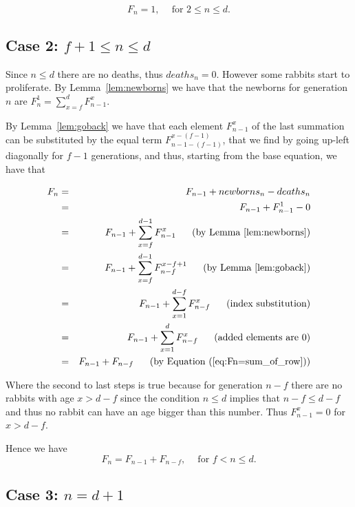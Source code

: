 \documentclass[11pt,epsf]{article}
\newcommand{\cfor}{{\text{ for }}}
\begin{document}
\begin{equation}\label{eq:case1}
F_n = 1, \ \ \ \ \cfor 2 \le n \le d.
\end{equation}


\subsection{Case 2: $f+1\le n\le d$}

Since $n\le d$ there are no deaths, thus $deaths_n=0$. However some rabbits start to proliferate.
By Lemma~\ref{lem:newborns} we have that the newborns for generation $n$ are
$F_n^1=\sum_{x=f}^d F_{n-1}^x$.

By Lemma~\ref{lem:goback} we have that each element $F_{n-1}^x$ of the last summation can be
substituted by the equal term $F_{n-1-(f-1)}^{x-(f-1)}$, that we find by going up-left diagonally for $f-1$ generations,
and thus, starting from the base equation, we have that

\begin{eqnarray*}
F_n&=&F_{n-1}+newborns_n-deaths_n\\
      &=&F_{n-1}+F_{n-1}^1-0\\
      &=&F_{n-1}+\sum_{x=f}^{d-1} F_{n-1}^x\makebox{\ \ \ \ \ (by Lemma~\ref{lem:newborns})}\\
      &=&F_{n-1}+\sum_{x=f}^{d-1} F_{n-f}^{x-f+1}\makebox{\ \ \ \ \ (by Lemma~\ref{lem:goback})}\\
      &=&F_{n-1}+\sum_{x=1}^{d-f} F_{n-f}^{x}\makebox{\ \ \ \ \ (index substitution)}\\
      &=&F_{n-1}+\sum_{x=1}^{d} F_{n-f}^{x}\makebox{\ \ \ \ \ (added elements are 0)}\\
      &=&F_{n-1}+F_{n-f}\makebox{\ \ \ \ \ (by Equation~(\ref{eq:Fn=sum_of_row}))}\\
\end{eqnarray*}

Where the second to last  steps is true because for generation $n-f$ there are no rabbits with age $x>d-f$ since
the condition $n\le d$ implies that $n-f\le d-f$ and thus no rabbit can have an age bigger than
this number. Thus $F_{n-1}^x=0$ for $x>d-f$. 

Hence we have 
\begin{equation}\label{eq:case2}
F_n = F_{n-1}+F_{n-f}, \ \ \ \ \cfor f < n \le d.
\end{equation}


\subsection{Case 3: $n=d+1$}
\end{document}
